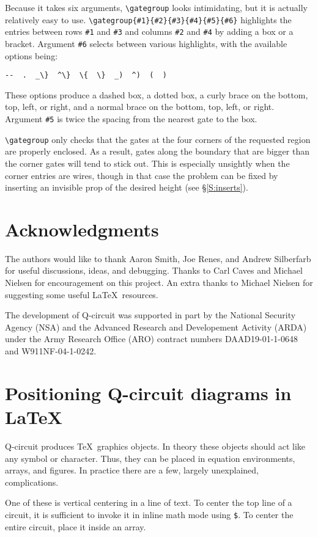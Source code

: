 \documentclass[twocolumn,nofootinbib]{revtex4}
\begin{document}
Because it takes six arguments, \verb=\gategroup= looks intimidating, but it is actually relatively easy to use.  \verb=\gategroup{#1}{#2}{#3}{#4}{#5}{#6}= highlights the entries between rows \verb=#1= and \verb=#3= and columns \verb=#2= and \verb=#4= by adding a box or a bracket.  Argument \verb=#6= selects between various highlights, with the available options being:
\begin{center} {\small \verb=--  .  _\}  ^\}  \{  \}  _)  ^)  (  )=} \end{center}
These options produce a dashed box, a dotted box, a curly brace on the bottom, top, left, or right, and a normal brace on the bottom, top, left, or right.  Argument \verb=#5= is twice the spacing from the nearest gate to the box.

\verb=\gategroup= only checks that the gates at the four corners of the requested region are properly enclosed.  As a result, gates along the boundary that are bigger than the corner gates will tend to stick out.  This is especially unsightly when the corner entries are wires, though in that case the problem can be fixed by inserting an invisible prop of the desired height (see \S\ref{S:inserts}).

\section{Acknowledgments}

The authors would like to thank Aaron Smith, Joe Renes, and Andrew Silberfarb for useful discussions, ideas, and debugging.  Thanks to Carl Caves and Michael Nielsen for encouragement on this project.  An extra thanks to Michael Nielsen for suggesting some useful \LaTeX \ resources.

The development of Q-circuit was supported in part by the National Security Agency (NSA) and the Advanced Research and Developement Activity (ARDA) under the Army Research Office (ARO) contract numbers DAAD19-01-1-0648 and W911NF-04-1-0242.

\appendix
\section{Positioning Q-circuit diagrams in \LaTeX}
Q-circuit produces \TeX\ graphics objects.  In theory these objects should act like any symbol or character.  Thus, they can be placed in equation environments, arrays, and figures.  In practice there are a few, largely unexplained, complications.

One of these is vertical centering in a line of text.  To center the top line of a circuit, it is sufficient to invoke it in inline math mode using \verb=$=.  To center the entire circuit, place it inside an array.
\end{document}
